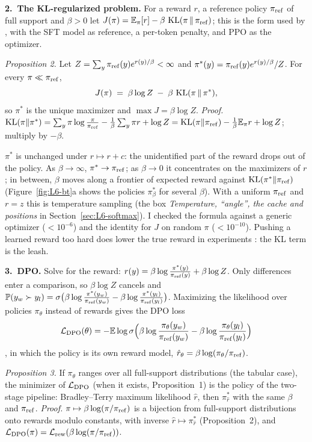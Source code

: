 \begin{beyond}
\textbf{2.\ The KL-regularized problem.} For a reward $r$, a reference policy $\pi_{\mathrm{ref}}$ of full support and $\beta>0$ let $J(\pi)=\mathbb{E}_{\pi}[r]-\beta\,\operatorname{KL}(\pi\,\|\,\pi_{\mathrm{ref}})$; this is the form used by \citet{ouyang2022}, with the SFT model as reference, a per-token penalty, and PPO as the optimizer.

\emph{Proposition 2.} Let $Z=\sum_y\pi_{\mathrm{ref}}(y)e^{r(y)/\beta}<\infty$ and $\pi^*(y)=\pi_{\mathrm{ref}}(y)e^{r(y)/\beta}/Z$. For every $\pi\ll\pi_{\mathrm{ref}}$,
\[
  J(\pi)\;=\;\beta\log Z\;-\;\beta\,\operatorname{KL}(\pi\,\|\,\pi^*),
\]
so $\pi^*$ is the unique maximizer and $\max J=\beta\log Z$. \emph{Proof.} $\operatorname{KL}(\pi\|\pi^*)=\sum_y\pi\log\frac{\pi}{\pi_{\mathrm{ref}}}-\frac1\beta\sum_y\pi r+\log Z=\operatorname{KL}(\pi\|\pi_{\mathrm{ref}})-\frac1\beta\mathbb{E}_\pi r+\log Z$; multiply by $-\beta$.~\qedsymbol

$\pi^*$ is unchanged under $r\mapsto r+c$: the unidentified part of the reward drops out of the policy. As $\beta\to\infty$, $\pi^*\to\pi_{\mathrm{ref}}$; as $\beta\to0$ it concentrates on the maximizers of $r$; in between, $\beta$ moves along a frontier of expected reward against $\operatorname{KL}(\pi^*\|\pi_{\mathrm{ref}})$ (Figure~\ref{fig:L6-bt}a shows the policies $\pi^*_\beta$ for several $\beta$). With a uniform $\pi_{\mathrm{ref}}$ and $r=z$ this is temperature sampling (the box \emph{Temperature, ``angle'', the cache and positions} in Section~\ref{sec:L6-softmax}). I checked the formula against a generic optimizer ($<10^{-6}$) and the identity for $J$ on random $\pi$ ($<10^{-10}$). Pushing a learned reward too hard does lower the true reward in experiments \citep{gao2023}: the KL term is the leash.

\textbf{3.\ DPO.} Solve for the reward: $r(y)=\beta\log\frac{\pi^*(y)}{\pi_{\mathrm{ref}}(y)}+\beta\log Z$. Only differences enter a comparison, so $\beta\log Z$ cancels and $\mathbb{P}(y_w\succ y_l)=\sigma\big(\beta\log\frac{\pi^*(y_w)}{\pi_{\mathrm{ref}}(y_w)}-\beta\log\frac{\pi^*(y_l)}{\pi_{\mathrm{ref}}(y_l)}\big)$. Maximizing the likelihood over policies $\pi_\theta$ instead of rewards gives the DPO loss
\[
  \mathcal{L}_{\mathrm{DPO}}(\theta)=-\mathbb{E}\log\sigma\Big(\beta\log\frac{\pi_\theta(y_w)}{\pi_{\mathrm{ref}}(y_w)}-\beta\log\frac{\pi_\theta(y_l)}{\pi_{\mathrm{ref}}(y_l)}\Big)
\]
\citep{rafailov2023}, in which the policy is its own reward model, $\hat r_\theta=\beta\log(\pi_\theta/\pi_{\mathrm{ref}})$.

\emph{Proposition 3.} If $\pi_\theta$ ranges over all full-support distributions (the tabular case), the minimizer of $\mathcal{L}_{\mathrm{DPO}}$ (when it exists, Proposition~1) is the policy of the two-stage pipeline: Bradley--Terry maximum likelihood $\hat r$, then $\pi^*_{\hat r}$ with the same $\beta$ and $\pi_{\mathrm{ref}}$. \emph{Proof.} $\pi\mapsto\beta\log(\pi/\pi_{\mathrm{ref}})$ is a bijection from full-support distributions onto rewards modulo constants, with inverse $\hat r\mapsto\pi^*_{\hat r}$ (Proposition~2), and $\mathcal{L}_{\mathrm{DPO}}(\pi)=\mathcal{L}_{\mathrm{rew}}(\beta\log(\pi/\pi_{\mathrm{ref}}))$.~\qedsymbol


\end{beyond}
